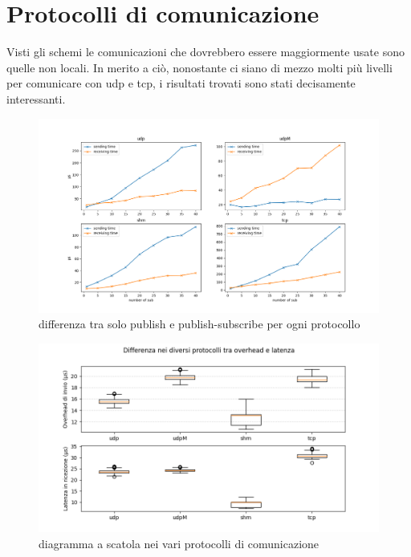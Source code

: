 \section{Protocolli di comunicazione}
Visti gli schemi %
le comunicazioni che dovrebbero essere maggiormente usate sono quelle non locali. In merito a ciò, nonostante ci siano di mezzo molti più livelli per comunicare con udp e tcp, i risultati trovati sono stati decisamente interessanti.

\begin{figure}[H]
    \includegraphics[width=\textwidth]{./results/test3_different_protocol_send_receive.png} 
        \caption{differenza tra solo publish e publish-subscribe per ogni protocollo}
        \label{fig:test3_different_protocols}
\end{figure}

\begin{figure}[H]
    \includegraphics[width=\textwidth]{./results/test1_box_sr_1p1s.png} 
        \caption{diagramma a scatola nei vari protocolli di comunicazione}
        \label{fig:test1sdbox}
\end{figure}

